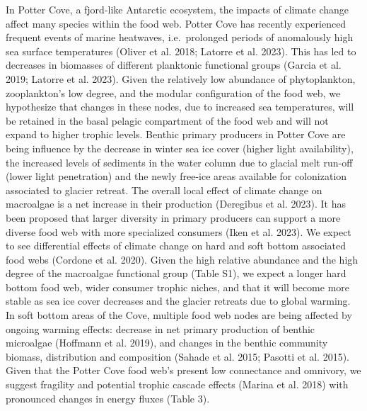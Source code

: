 \documentclass[
]{article}
\begin{document}
In Potter Cove, a fjord-like Antarctic ecosystem, the impacts of climate
change affect many species within the food web. Potter Cove has recently
experienced frequent events of marine heatwaves, i.e.~prolonged periods
of anomalously high sea surface temperatures (Oliver et al. 2018;
Latorre et al. 2023). This has led to decreases in biomasses of
different planktonic functional groups (Garcia et al. 2019; Latorre et
al. 2023). Given the relatively low abundance of phytoplankton,
zooplankton's low degree, and the modular configuration of the food web,
we hypothesize that changes in these nodes, due to increased sea
temperatures, will be retained in the basal pelagic compartment of the
food web and will not expand to higher trophic levels. Benthic primary
producers in Potter Cove are being influence by the decrease in winter
sea ice cover (higher light availability), the increased levels of
sediments in the water column due to glacial melt run-off (lower light
penetration) and the newly free-ice areas available for colonization
associated to glacier retreat. The overall local effect of climate
change on macroalgae is a net increase in their production (Deregibus et
al. 2023). It has been proposed that larger diversity in primary
producers can support a more diverse food web with more specialized
consumers (Iken et al. 2023). We expect to see differential effects of
climate change on hard and soft bottom associated food webs (Cordone et
al. 2020). Given the high relative abundance and the high degree of the
macroalgae functional group (Table S1), we expect a longer hard bottom
food web, wider consumer trophic niches, and that it will become more
stable as sea ice cover decreases and the glacier retreats due to global
warming. In soft bottom areas of the Cove, multiple food web nodes are
being affected by ongoing warming effects: decrease in net primary
production of benthic microalgae (Hoffmann et al. 2019), and changes in
the benthic community biomass, distribution and composition (Sahade et
al. 2015; Pasotti et al. 2015). Given that the Potter Cove food web's
present low connectance and omnivory, we suggest fragility and potential
trophic cascade effects (Marina et al. 2018) with pronounced changes in
energy fluxes (Table 3).
\end{document}
